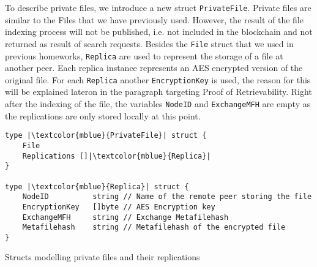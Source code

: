 \documentclass{article}
\begin{document}

To describe private files, we introduce a new struct \texttt{PrivateFile}. Private files are similar to the Files that we have previously used. However, the result of the file indexing process will not be published, i.e. not included in the blockchain and not returned as result of search requests. 
Besides the \texttt{File} struct that we used in previous homeworks, \texttt{Replica} are used to represent the storage of a file at another peer. Each replica instance represents an AES encrypted version of the original file. For each \texttt{Replica} another \texttt{EncryptionKey} is used, the reason for this will be explained lateron in the paragraph targeting Proof of Retrievability. Right after the indexing of the file, the variables \texttt{NodeID} and \texttt{ExchangeMFH} are empty as the replications are only stored locally at this point. \\\vspace{0.5em}

\begin{listing}
\begin{verbatim}
type |\textcolor{mblue}{PrivateFile}| struct {
	File
	Replications []|\textcolor{mblue}{Replica}|
}

type |\textcolor{mblue}{Replica}| struct {
	NodeID          string // Name of the remote peer storing the file
	EncryptionKey   []byte // AES Encryption key
	ExchangeMFH     string // Exchange Metafilehash
	Metafilehash    string // Metafilehash of the encrypted file
}
\end{verbatim}
\caption{Structs modelling private files and their replications}
\end{listing}
\end{document}
